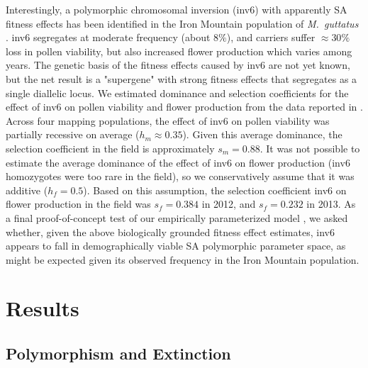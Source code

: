 \documentclass[11pt]{article}
\begin{document}
Interestingly, a polymorphic chromosomal inversion (inv6) with apparently SA fitness effects has been identified in the Iron Mountain population of {\itshape M.~guttatus} \citep{LeeKelly2015}. inv6 segregates at moderate frequency (about $8\%$), and carriers suffer $\approx 30 \%$ loss in pollen viability, but also increased flower production which varies among years. The genetic basis of the fitness effects caused by inv6 are not yet known, but the net result is a "supergene" with strong fitness effects that segregates as a single diallelic locus. We estimated dominance and selection coefficients for the effect of inv6 on pollen viability and flower production from the data reported in \citet{LeeKelly2015}. Across four mapping populations, the effect of inv6 on pollen viability was partially recessive on average ($h_m \approx 0.35$). Given this average dominance, the selection coefficient in the field is approximately $s_m = 0.88$. It was not possible to estimate the average dominance of the effect of inv6 on flower production (inv6 homozygotes were too rare in the field), so we conservatively assume that it was additive ($h_f = 0.5$). Based on this assumption, the selection coefficient inv6 on flower production in the field was $s_f = 0.384$ in 2012, and $s_f = 0.232$ in 2013. As a final proof-of-concept test of our empirically parameterized model \citep[e.g.,][]{Servedio2014}, we asked whether, given the above biologically grounded fitness effect estimates, inv6 appears to fall in demographically viable SA polymorphic parameter space, as might be expected given its observed frequency in the Iron Mountain population.


\section*{Results}\label{sec:Results}

\subsection*{Polymorphism and Extinction}\label{subsec:PolyExt}
\end{document}

